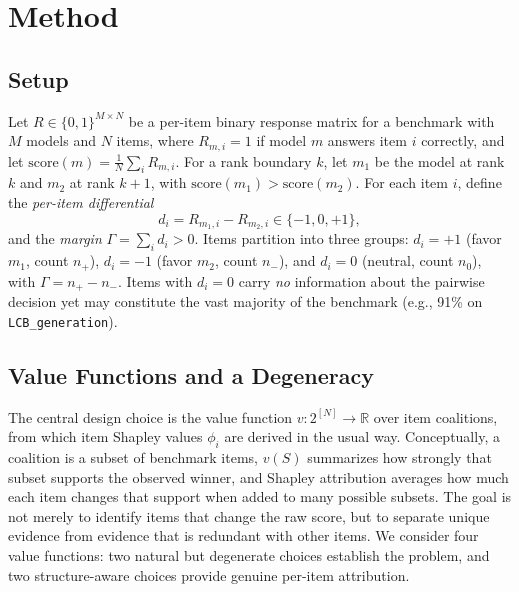 \documentclass[conference]{IEEEtran}
\begin{document}
\section{Method}
\label{sec:method}

\subsection{Setup}
\label{sec:setup}

Let $R \in \{0,1\}^{M \times N}$ be a per-item binary response matrix for a benchmark with $M$ models and $N$ items, where $R_{m,i} = 1$ if model $m$ answers item $i$ correctly, and let $\text{score}(m) = \frac{1}{N}\sum_{i} R_{m,i}$.
For a rank boundary $k$, let $m_1$ be the model at rank $k$ and $m_2$ at rank $k\!+\!1$, with $\text{score}(m_1) > \text{score}(m_2)$.
For each item $i$, define the \emph{per-item differential}
\begin{equation}
    d_i = R_{m_1, i} - R_{m_2, i} \in \{-1, 0, +1\},
    \label{eq:differential}
\end{equation}
and the \emph{margin} $\Gamma = \sum_{i} d_i > 0$.
Items partition into three groups: $d_i = +1$ (favor $m_1$, count $n_+$), $d_i = -1$ (favor $m_2$, count $n_-$), and $d_i = 0$ (neutral, count $n_0$), with $\Gamma = n_+ - n_-$.
Items with $d_i = 0$ carry \emph{no} information about the pairwise decision yet may constitute the vast majority of the benchmark (e.g., 91\% on \texttt{LCB\_generation}).

\subsection{Value Functions and a Degeneracy}
\label{sec:value}

The central design choice is the value function $v: 2^{[N]} \to \mathbb{R}$ over item coalitions, from which item Shapley values $\phi_i$ are derived in the usual way.
Conceptually, a coalition is a subset of benchmark items, $v(S)$ summarizes how strongly that subset supports the observed winner, and Shapley attribution averages how much each item changes that support when added to many possible subsets.
The goal is not merely to identify items that change the raw score, but to separate unique evidence from evidence that is redundant with other items.
We consider four value functions: two natural but degenerate choices establish the problem, and two structure-aware choices provide genuine per-item attribution.
\end{document}
